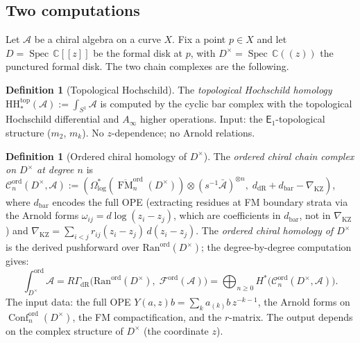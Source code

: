 \documentclass[11pt,reqno]{amsart}
\theoremstyle{definition}
\newtheorem{definition}[theorem]{Definition}
\theoremstyle{remark}
\newcommand{\cA}{\mathcal{A}}
\newcommand{\cC}{\mathcal{C}}
\newcommand{\cF}{\mathcal{F}}
\newcommand{\Ran}{\mathrm{Ran}}
\newcommand{\HH}{\mathrm{HH}}
\newcommand{\Ainf}{A_{\infty}}
\newcommand{\Eone}{\mathsf{E}_{1}}
\DeclareMathOperator{\Conf}{Conf}
\DeclareMathOperator{\FM}{FM}
\DeclareMathOperator{\Spec}{Spec}
\newcommand{\CC}{\mathbb{C}}
\numberwithin{equation}{section}
\begin{document}
\subsection{Two computations}
\label{subsec:two-computations}

Let $\cA$ be a chiral algebra on a curve $X$. Fix a point
$p \in X$ and let $D = \Spec\, \CC[[z]]$ be the formal disk
at $p$, with $D^\times = \Spec\, \CC((z))$ the punctured
formal disk. The two chain complexes are the following.

\begin{definition}[Topological Hochschild]
\label{def:top-hh}
The \emph{topological Hochschild homology}
$\HH^{\mathrm{top}}_*(\cA) := \int_{S^1} \cA$
is computed by the cyclic bar complex with the topological Hochschild
differential and $\Ainf$ higher operations.
Input: the $\Eone$-topological structure ($m_2$, $m_k$).
No $z$-dependence; no Arnold relations.
\end{definition}

\begin{definition}[Ordered chiral homology of $D^\times$]
\label{def:ch-hom-Dx}
The \emph{ordered chiral chain complex on $D^\times$ at
degree $n$} is
$\cC_n^{\mathrm{ord}}(D^\times, \cA)
:= (\Omega^*_{\log}(
\overline{\FM}_n^{\mathrm{ord}}(D^\times))
\otimes (s^{-1}\bar{\cA})^{\otimes n},\;
d_{\mathrm{dR}} + d_{\mathrm{bar}}
- \nabla_{\mathrm{KZ}})$,
where $d_{\mathrm{bar}}$ encodes the full OPE
(extracting residues at FM boundary strata via the Arnold
forms $\omega_{ij} = d\log(z_i - z_j)$, which are
coefficients in $d_{\mathrm{bar}}$, not in
$\nabla_{\mathrm{KZ}}$) and $\nabla_{\mathrm{KZ}}
= \sum_{i<j} r_{ij}(z_i - z_j)\,d(z_i - z_j)$.
The \emph{ordered chiral homology of $D^\times$} is the
derived pushforward over
$\Ran^{\mathrm{ord}}(D^\times)$; the degree-by-degree
computation gives:
\begin{equation}\label{eq:ch-hom-Dx}
  \int_{D^\times}^{\mathrm{ord}} \cA
  = R\Gamma_{\mathrm{dR}}\bigl(
  \Ran^{\mathrm{ord}}(D^\times),\;
  \cF^{\mathrm{ord}}(\cA)\bigr)
  = \bigoplus_{n \geq 0}
  H^*\bigl(\cC_n^{\mathrm{ord}}(D^\times, \cA)\bigr).
\end{equation}
The input data: the full OPE
$Y(a,z)b = \sum_k a_{(k)}b \, z^{-k-1}$, the Arnold
forms on $\Conf_n^{\mathrm{ord}}(D^\times)$, the FM
compactification, and the $r$-matrix. The output depends
on the complex structure of $D^\times$ \textup{(}the
coordinate $z$\textup{)}.
\end{definition}
\end{document}
